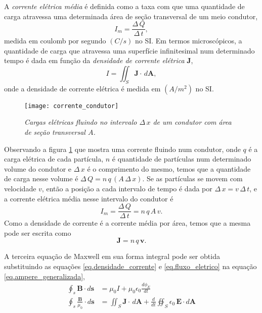 A \textit{corrente elétrica média} é definida como a taxa com que uma quantidade de carga atravessa uma determinada área de seção transversal de um meio condutor,
\begin{equation*}
I_m=\frac{\Delta\,Q}{\Delta\,t},
\end{equation*}
medida em coulomb por segundo $(C/s)$ no SI. Em termos microscópicos, a quantidade de carga que atravessa uma superfície infinitesimal num determinado tempo é dada em função da \textit{densidade de corrente elétrica} $\mathbf{J}$,
\begin{equation}\label{eq.densidade_corrente}
I=\iint_S\mathbf{J}\cdot\,d\mathbf{A},
\end{equation}
onde a densidade de corrente elétrica é medida em $(A/m^2)$ no SI. 
\begin{figure}
\centering
\texttt{[image: corrente\_condutor]}
\caption{\textit{Cargas elétricas fluindo no intervalo $\Delta\,x$ de um condutor com área de seção transversal $A$.}}
\label{fig.corre_condu}
\end{figure}
Observando a figura \ref{fig.corre_condu} que mostra uma corrente fluindo num condutor, onde $q$ é a carga elétrica de cada partícula, $n$ é quantidade de partículas num determinado volume do condutor e $\Delta\,x$ é o comprimento do mesmo, temos que a quantidade de carga nesse volume é $\Delta\,Q=n\,q\,(A\,\Delta\,x)$. Se as partículas se movem com velocidade $v$, então a posição a cada intervalo de tempo é dada por $\Delta\,x=v\,\Delta\,t$, e a corrente elétrica média nesse intervalo do condutor é
\begin{equation*}
I_m=\frac{\Delta\,Q}{\Delta\,t}=n\,q\,A\,v.
\end{equation*}
Como a densidade de corrente é a corrente média por área, temos que a mesma pode ser escrita como 
\begin{equation}\label{eq.densidade_corrente}
\mathbf{J}=n\,q\,\mathbf{v}.
\end{equation}

A terceira equação de Maxwell em sua forma integral pode ser obtida substituindo as equações \ref{eq.densidade_corrente} e \ref{eq.fluxo_eletrico} na equação \ref{eq.ampere_generalizada},
\begin{align*}
\oint_s\mathbf{B}\cdot d\mathbf{s}&=\mu_0I+\mu_0\epsilon_0\frac{d\phi_E}{dt}\\
\oint_s\frac{\mathbf{B}}{\mu_0}\cdot d\mathbf{s}&=\iint_S\mathbf{J}\cdot\,d\mathbf{A}+\frac{d}{dt}\oiint_S\epsilon_0\,\textbf{E}\cdot\textit{d}\textbf{A}
\end{align*}

